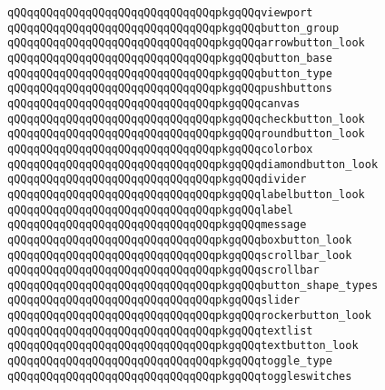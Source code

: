 \verb|qQQqqQQqqQQqqQQqqQQqqQQqqQQqqQQqpkgqQQqviewport|\newline
\verb|qQQqqQQqqQQqqQQqqQQqqQQqqQQqqQQqpkgqQQqbutton_group|\newline
\verb|qQQqqQQqqQQqqQQqqQQqqQQqqQQqqQQqpkgqQQqarrowbutton_look|\newline
\verb|qQQqqQQqqQQqqQQqqQQqqQQqqQQqqQQqpkgqQQqbutton_base|\newline
\verb|qQQqqQQqqQQqqQQqqQQqqQQqqQQqqQQqpkgqQQqbutton_type|\newline
\verb|qQQqqQQqqQQqqQQqqQQqqQQqqQQqqQQqpkgqQQqpushbuttons|\newline
\verb|qQQqqQQqqQQqqQQqqQQqqQQqqQQqqQQqpkgqQQqcanvas|\newline
\verb|qQQqqQQqqQQqqQQqqQQqqQQqqQQqqQQqpkgqQQqcheckbutton_look|\newline
\verb|qQQqqQQqqQQqqQQqqQQqqQQqqQQqqQQqpkgqQQqroundbutton_look|\newline
\verb|qQQqqQQqqQQqqQQqqQQqqQQqqQQqqQQqpkgqQQqcolorbox|\newline
\verb|qQQqqQQqqQQqqQQqqQQqqQQqqQQqqQQqpkgqQQqdiamondbutton_look|\newline
\verb|qQQqqQQqqQQqqQQqqQQqqQQqqQQqqQQqpkgqQQqdivider|\newline
\verb|qQQqqQQqqQQqqQQqqQQqqQQqqQQqqQQqpkgqQQqlabelbutton_look|\newline
\verb|qQQqqQQqqQQqqQQqqQQqqQQqqQQqqQQqpkgqQQqlabel|\newline
\verb|qQQqqQQqqQQqqQQqqQQqqQQqqQQqqQQqpkgqQQqmessage|\newline
\verb|qQQqqQQqqQQqqQQqqQQqqQQqqQQqqQQqpkgqQQqboxbutton_look|\newline
\verb|qQQqqQQqqQQqqQQqqQQqqQQqqQQqqQQqpkgqQQqscrollbar_look|\newline
\verb|qQQqqQQqqQQqqQQqqQQqqQQqqQQqqQQqpkgqQQqscrollbar|\newline
\verb|qQQqqQQqqQQqqQQqqQQqqQQqqQQqqQQqpkgqQQqbutton_shape_types|\newline
\verb|qQQqqQQqqQQqqQQqqQQqqQQqqQQqqQQqpkgqQQqslider|\newline
\verb|qQQqqQQqqQQqqQQqqQQqqQQqqQQqqQQqpkgqQQqrockerbutton_look|\newline
\verb|qQQqqQQqqQQqqQQqqQQqqQQqqQQqqQQqpkgqQQqtextlist|\newline
\verb|qQQqqQQqqQQqqQQqqQQqqQQqqQQqqQQqpkgqQQqtextbutton_look|\newline
\verb|qQQqqQQqqQQqqQQqqQQqqQQqqQQqqQQqpkgqQQqtoggle_type|\newline
\verb|qQQqqQQqqQQqqQQqqQQqqQQqqQQqqQQqpkgqQQqtoggleswitches|\newline
